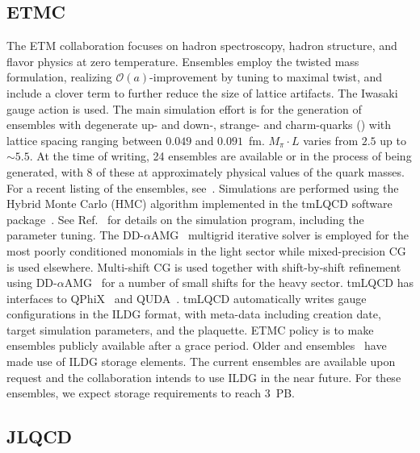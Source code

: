 \documentclass[a4paper,11pt]{article}
\begin{document}
\subsection{ETMC}
\begin{linenumbers}[1]
The ETM collaboration focuses on hadron spectroscopy, hadron
structure, and flavor physics at zero temperature. Ensembles employ
the twisted mass formulation, realizing $\mathcal{O}(a)$-improvement
by tuning to maximal twist, and include a clover term to further
reduce the size of lattice artifacts. The Iwasaki gauge action is
used. The main simulation effort is for the generation of ensembles
with degenerate up- and down-, strange- and charm-quarks
() with lattice spacing ranging between $0.049$ and
$0.091$~fm. $M_\pi\cdot L$ varies from $2.5$ up to ${\sim}5.5$. At the
time of writing, 24 ensembles are available or in the process of being
generated, with 8 of these at approximately physical values of the
quark masses. For a recent listing of the ensembles,
see~\cite{ETMCPoster:2024}. Simulations are performed using the Hybrid
Monte Carlo (HMC) algorithm implemented in the tmLQCD software
package~\cite{Jansen:2009xp,Deuzeman:2013xaa,Abdel-Rehim:2013wba}. See
Ref.~\cite{Alexandrou:2018egz} for details on the simulation program,
including the parameter tuning. The
DD-$\alpha$AMG~\cite{Frommer:2013fsa,Alexandrou:2016izb} multigrid
iterative solver is employed for the most poorly conditioned monomials
in the light sector while mixed-precision CG is used
elsewhere. Multi-shift CG is used together with shift-by-shift
refinement using DD-$\alpha$AMG~\cite{Alexandrou:2018wiv} for a number
of small shifts for the heavy sector. tmLQCD has interfaces to
QPhiX~\cite{Joo:2013lwm} and QUDA~\cite{Clark:2009wm,Babich:2011np}.
tmLQCD automatically writes gauge configurations in the ILDG format,
with meta-data including creation date, target simulation parameters,
and the plaquette. ETMC policy is to make ensembles publicly
available after a grace period. Older  and 
ensembles~\cite{Baron:2010bv,EuropeanTwistedMass:2010voq,ETM:2009ztk}
have made use of ILDG storage elements. The current ensembles are
available upon request and the collaboration intends to use ILDG in
the near future. For these ensembles, we expect storage requirements
to reach 3~PB.
\end{linenumbers}

\subsection{JLQCD}
\end{document}

